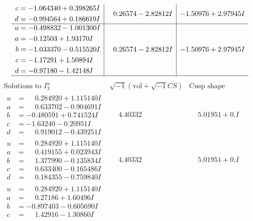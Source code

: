 \documentclass[1p]{elsarticle_modified}
\theoremstyle{definition}
\newcommand{\I}{\sqrt{-1}}
\begin{document}
$$\begin{array}{c|c|c}
\begin{aligned}
c &= -1.064340 + 0.398265 I \\
d &= -0.994564 + 0.186619 I\end{aligned}
 & \phantom{-}0.26574 - 2.82812 I & -1.50976 + 2.97945 I \\ \hline\begin{aligned}
u &= -0.498832 - 1.001300 I \\
a &= -0.12503 + 1.93170 I \\
b &= -1.033370 - 0.515520 I \\
c &= -1.17291 + 1.50894 I \\
d &= -0.97180 - 1.42148 I\end{aligned}
 & \phantom{-}0.26574 - 2.82812 I & -1.50976 + 2.97945 I\\
 \hline 
 \end{array}$$\newpage$$\begin{array}{c|c|c}  
\text{Solutions to }I^u_{3}& \I (\text{vol} + \sqrt{-1}CS) & \text{Cusp shape}\\
 \hline 
\begin{aligned}
u &= \phantom{-}0.284920 + 1.115140 I \\
a &= \phantom{-}0.633702 - 0.904691 I \\
b &= -0.480591 + 0.741524 I \\
c &= -1.63240 - 0.20951 I \\
d &= \phantom{-}0.919012 - 0.439251 I\end{aligned}
 & \phantom{-}4.40332\phantom{ +0.000000I} & \phantom{-}5.01951 + 0. I\phantom{ +0.000000I} \\ \hline\begin{aligned}
u &= \phantom{-}0.284920 + 1.115140 I \\
a &= \phantom{-}0.419155 + 0.023943 I \\
b &= \phantom{-}1.377990 - 0.135834 I \\
c &= \phantom{-}0.633400 - 0.165486 I \\
d &= \phantom{-}0.184355 - 0.759840 I\end{aligned}
 & \phantom{-}4.40332\phantom{ +0.000000I} & \phantom{-}5.01951 + 0. I\phantom{ +0.000000I} \\ \hline\begin{aligned}
u &= \phantom{-}0.284920 + 1.115140 I \\
a &= \phantom{-}0.27186 + 1.60496 I \\
b &= -0.897403 - 0.605690 I \\
c &= \phantom{-}1.42916 - 1.30860 I \\

\end{aligned}
\end{array}$$
\end{document}
